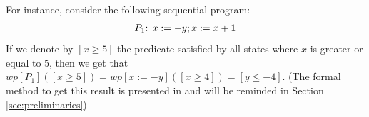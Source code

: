 \documentclass[a4paper,10pt]{llncs}
\begin{document}



For instance, consider the following sequential program:
\begin{align*}
 P_1\textnormal{: } x := -y ; x := x+1
\end{align*}
If we denote by $[x \geq 5]$ the predicate satisfied by all states where $x$ is greater or equal to $5$, then we get that $wp[P_1]([x \geq 5]) = wp[x := -y]([x \geq 4]) = [y \leq -4]$. (The formal method to get this result is presented in \cite{Dijkstra76} and will be reminded in Section \ref{sec:preliminaries})\bigskip
\end{document}
